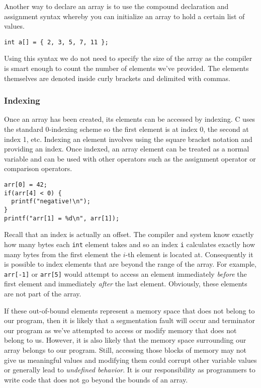 Another way to declare an array is to use the compound declaration
and assignment syntax whereby you can initialize an array to hold
a certain list of values.  

\begin{verbatim}
int a[] = { 2, 3, 5, 7, 11 };
\end{verbatim}

Using this syntax we do not need to specify the size of the array 
as the compiler is smart enough to count the number of elements
we've provided.  The elements themselves are denoted inside curly
brackets and delimited with commas.

\subsubsection{Indexing}

Once an array has been created, its elements can be accessed
by indexing.  C uses the standard 0-indexing scheme so the
first element is at index 0, the second at index 1, etc.  Indexing
an element involves using the square bracket notation and
providing an index.  Once indexed, an array element can be
treated as a normal variable and can be used with other operators
such as the assignment operator or comparison operators.

\begin{verbatim}
arr[0] = 42;
if(arr[4] < 0) {
  printf("negative!\n");
}
printf("arr[1] = %d\n", arr[1]);
\end{verbatim}

Recall that an index is actually an offset.  The compiler and
system know exactly how many bytes each \texttt{int}
element takes and so an index \texttt{i} calculates
exactly how many bytes from the first element the $i$-th
element is located at.  Consequently it is possible to index
elements that are beyond the range of the array.  For example, 
\texttt{arr[-1]} or \texttt{arr[5]} would attempt
to access an element immediately \emph{before} the first element
and immediately \emph{after} the last element.  Obviously, 
these elements are not part of the array.  

If these out-of-bound elements represent a memory space
that does not belong to our program, then it is likely that
a \gls{segmentation fault} will occur and terminator our program
as we've attempted to access or modify memory that does
not belong to us.  However, it is also likely that the memory 
space surrounding our array belongs to our program.  Still,
accessing those blocks of memory may not give us meaningful
values and modifying them could corrupt other variable values
or generally lead to \emph{undefined behavior}.  It is our
responsibility as programmers to write code that does not
go beyond the bounds of an array.

